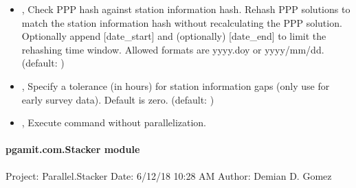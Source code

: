 \documentclass[letterpaper,10pt,english]{sphinxmanual}
\begin{document}
\begin{itemize}
\item {} 
\sphinxAtStartPar
{\hyperref[\detokenize{pgamit.com:ScanArchive.py--rehash}]{}} , {\hyperref[\detokenize{pgamit.com:ScanArchive.py---rehash}]{}}  \sphinxhyphen{} Check PPP hash against station information hash. Rehash PPP solutions to match the station information hash without recalculating the PPP solution. Optionally append {[}date\_start{]} and (optionally) {[}date\_end{]} to limit the rehashing time window. Allowed formats are yyyy.doy or yyyy/mm/dd. (default: )

\item {} 
\sphinxAtStartPar
{\hyperref[\detokenize{pgamit.com:ScanArchive.py--tol}]{}} , {\hyperref[\detokenize{pgamit.com:ScanArchive.py---stninfo_tolerant}]{}}  \sphinxhyphen{} Specify a tolerance (in hours) for station information gaps (only use for early survey data). Default is zero. (default: \sphinxcode{\sphinxupquote{{[}0{]}}})

\item {} 
\sphinxAtStartPar
{\hyperref[\detokenize{pgamit.com:ScanArchive.py--np}]{}}, {\hyperref[\detokenize{pgamit.com:ScanArchive.py---noparallel}]{}} \sphinxhyphen{} Execute command without parallelization.

\end{itemize}


\paragraph{pgamit.com.Stacker module}
\label{\detokenize{pgamit.com:module-pgamit.com.Stacker}}\label{\detokenize{pgamit.com:pgamit-com-stacker-module}}
\sphinxAtStartPar
Project: Parallel.Stacker
Date: 6/12/18 10:28 AM
Author: Demian D. Gomez
\end{document}
